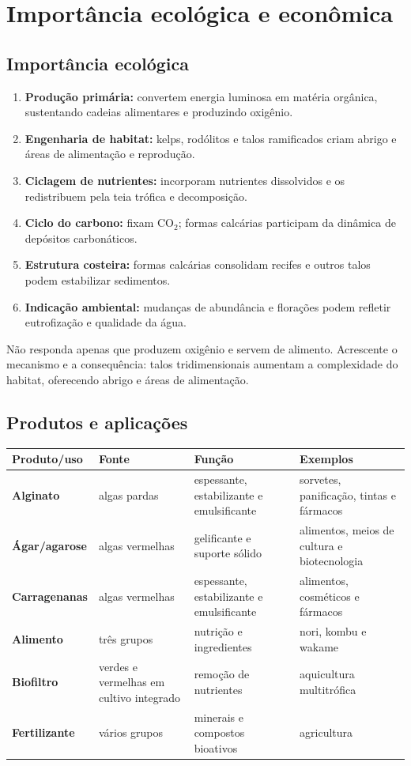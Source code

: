 \documentclass[12pt,a4paper]{article}
\begin{document}
\section{Importância ecológica e econômica}

\subsection{Importância ecológica}
\begin{enumerate}
\item \textbf{Produção primária:} convertem energia luminosa em matéria
orgânica, sustentando cadeias alimentares e produzindo oxigênio.
\item \textbf{Engenharia de habitat:} kelps, rodólitos e talos ramificados
criam abrigo e áreas de alimentação e reprodução.
\item \textbf{Ciclagem de nutrientes:} incorporam nutrientes dissolvidos e os
redistribuem pela teia trófica e decomposição.
\item \textbf{Ciclo do carbono:} fixam CO$_2$; formas calcárias participam da
dinâmica de depósitos carbonáticos.
\item \textbf{Estrutura costeira:} formas calcárias consolidam recifes e outros
talos podem estabilizar sedimentos.
\item \textbf{Indicação ambiental:} mudanças de abundância e florações podem
refletir eutrofização e qualidade da água.
\end{enumerate}

\begin{raciocinio}
Não responda apenas que produzem oxigênio e servem de alimento. Acrescente o
mecanismo e a consequência: talos tridimensionais aumentam a complexidade do
habitat, oferecendo abrigo e áreas de alimentação.
\end{raciocinio}

\subsection{Produtos e aplicações}
\begin{center}
\begin{tabularx}{\textwidth}{>{\bfseries}p{}p{}YY}
\toprule
Produto/uso & Fonte & Função & Exemplos\\
\midrule
Alginato & algas pardas & espessante, estabilizante e emulsificante & sorvetes,
panificação, tintas e fármacos\\
Ágar/agarose & algas vermelhas & gelificante e suporte sólido & alimentos, meios
de cultura e biotecnologia\\
Carragenanas & algas vermelhas & espessante, estabilizante e emulsificante &
alimentos, cosméticos e fármacos\\
Alimento & três grupos & nutrição e ingredientes & nori, kombu e wakame\\
Biofiltro & verdes e vermelhas em cultivo integrado & remoção de nutrientes &
aquicultura multitrófica\\
Fertilizante & vários grupos & minerais e compostos bioativos & agricultura\\
\bottomrule
\end{tabularx}
\end{center}
\end{document}
